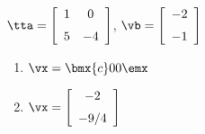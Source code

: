{$\tta = \left[ \begin {array}{cc} 1&0\\\noalign{\medskip}5&-4\end {array}
\right]$, $\vb=\left[ \begin {array}{c} -2\\\noalign{\medskip}-1\end {array}
 \right]$}
{\begin{enumerate}
\item	 $\vx=\bmx{c}0\\0\emx$
\item	 $\vx=\left[ \begin {array}{c} -2\\\noalign{\medskip}-9/4\end {array}
\right]$
\end{enumerate}
 }







